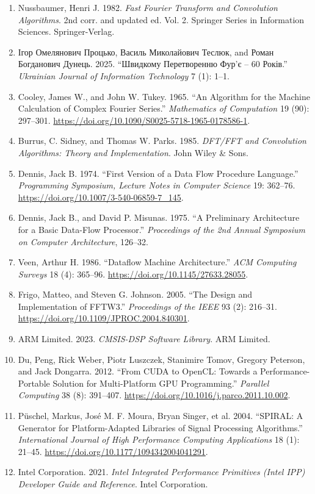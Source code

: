 \begin{enumerate}
\def\labelenumi{\arabic{enumi}.}
\item
  Nussbaumer, Henri J. 1982. \emph{Fast Fourier Transform and
  Convolution Algorithms}. 2nd corr. and updated ed. Vol. 2. Springer
  Series in Information Sciences. Springer-Verlag.
\item
  Ігор Омелянович Процько, Василь Миколайович Теслюк, and Роман
  Богданович Дунець. 2025. ``Швидкому Перетворенню Фур'є -- 60 Років.''
  \emph{Ukrainian Journal of Information Technology} 7 (1): 1--1.
\item
  Cooley, James W., and John W. Tukey. 1965. ``An Algorithm for the
  Machine Calculation of Complex Fourier Series.'' \emph{Mathematics of
  Computation} 19 (90): 297--301.
  \url{https://doi.org/10.1090/S0025-5718-1965-0178586-1}.
\item
  Burrus, C. Sidney, and Thomas W. Parks. 1985. \emph{DFT/FFT and
  Convolution Algorithms: Theory and Implementation}. John Wiley \&
  Sons.
\item
  Dennis, Jack B. 1974. ``First Version of a Data Flow Procedure
  Language.'' \emph{Programming Symposium, Lecture Notes in Computer
  Science} 19: 362--76. \url{https://doi.org/10.1007/3-540-06859-7_145}.
\item
  Dennis, Jack B., and David P. Misunas. 1975. ``A Preliminary
  Architecture for a Basic Data-Flow Processor.'' \emph{Proceedings of
  the 2nd Annual Symposium on Computer Architecture}, 126--32.
\item
  Veen, Arthur H. 1986. ``Dataflow Machine Architecture.'' \emph{ACM
  Computing Surveys} 18 (4): 365--96.
  \url{https://doi.org/10.1145/27633.28055}.
\item
  Frigo, Matteo, and Steven G. Johnson. 2005. ``The Design and
  Implementation of FFTW3.'' \emph{Proceedings of the IEEE} 93 (2):
  216--31. \url{https://doi.org/10.1109/JPROC.2004.840301}.
\item
  ARM Limited. 2023. \emph{CMSIS-DSP Software Library}. ARM Limited.
\item
  Du, Peng, Rick Weber, Piotr Luszczek, Stanimire Tomov, Gregory
  Peterson, and Jack Dongarra. 2012. ``From CUDA to OpenCL: Towards a
  Performance-Portable Solution for Multi-Platform GPU Programming.''
  \emph{Parallel Computing} 38 (8): 391--407.
  \url{https://doi.org/10.1016/j.parco.2011.10.002}.
\item
  Püschel, Markus, José M. F. Moura, Bryan Singer, et al. 2004.
  ``SPIRAL: A Generator for Platform-Adapted Libraries of Signal
  Processing Algorithms.'' \emph{International Journal of High
  Performance Computing Applications} 18 (1): 21--45.
  \url{https://doi.org/10.1177/1094342004041291}.
\item
  Intel Corporation. 2021. \emph{Intel Integrated Performance Primitives
  (Intel IPP) Developer Guide and Reference}. Intel Corporation.
\end{enumerate}
